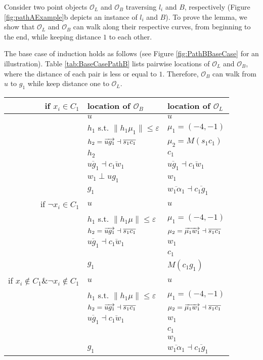 \documentclass[12pt]{dalthesis}
\def\favoritefont{\bfseries \sffamily}
\def\QED{\ensuremath{{\Box}}}
\def\markatright#1{\leavevmode\unskip\nobreak\quad\hspace*{\fill}{#1}}
\newenvironment{proof}
	{\begin{trivlist}\item[\hskip\labelsep{\favoritefont Proof:}]}
	{\markatright{\QED}\end{trivlist}}
\newcommand{\eps}{\varepsilon}
\newcommand{\CO}{{\mathscr O}}
\newcommand{\Seg}[1]{{\overline{#1}}}
\newcommand{\cfev}{{l}}
\begin{document}
\begin{proof}



Consider two point objects $\CO_L$ and $\CO_B$ 
traversing $\cfev_i$ and $B$, respectively (Figure \ref{fig:pathAExample}b depicts an instance of $\cfev_i$ and $B$).
To prove the lemma, we show that $\CO_L$ and $\CO_B$ can walk along
their respective curves, from beginning to
the end, while keeping distance $1$ to each other. 

The base case of induction holds as follows 
(see Figure \ref{fig:PathBBaseCase} for an illustration).
Table \ref{tab:BaseCasePathB} lists  pairwise locations of 
$\CO_L$ and $\CO_B$, where the distance of each pair is less or equal to $1$.
Therefore, $\CO_B$ can walk from $u$ to $g_1$ while
keep distance one to $\CO_L$.

\begin{table}[h]
\centering
\begin{tabular}{ r | l | l  }
if $x_i \in C_1$   & location of $\CO_B$ & location of $\CO_L$  
 \\
\hline
    
&  $u$ & $u$  \\
&  				 $h_1$ s.t.  $\| h_1\mu_1 \| \le \eps$ & $\mu_1 = (-4,-1)$\\

				&    $h_2 = \Dir{ug_1} \dashv	 \Seg{s_1c_1} $ & $\mu_2 = M(s_1c_1)$   \\
&  				 			      $h_2 $ & $c_1$  \\
&    $\Seg{ug_1} \dashv \Seg{c_1w_1}$ &  $\Seg{ug_1} \dashv \Seg{c_1w_1}$ \\
&  				 		     $w_1 \perp ug_1 $ &   $w_1$  \\
& $g_1 $  & $\Seg{w_1\alpha_1}	\dashv \Seg{c_1g_1}$	      \\

\hline
if $\neg x_i \in C_1$ 
&  $u$ & $u$  \\
&  				 $h_1$ s.t.  $\| h_1\mu \| \le \eps$ & $\mu_1 = (-4,-1)$\\
& $h_2 = \Dir{ug_1} \dashv	 \Seg{s_1c_1} $ &  $\mu_2 = \Dir{\mu_1w_1} \dashv	 \Seg{s_1c_1} $\\
& $\Seg{ug_1} \dashv \Seg{c_1w_1}$ & $w_1$ \\
&  &  $c_1$\\
& $g_1$ &  $M(c_1g_1)$\\

\hline
if $x_i \notin C_{1} \& \neg x_i \notin C_{1}$ & $u$ & $u$  \\
&  				 $h_1$ s.t.  $\| h_1\mu \| \le \eps$ & $\mu_1 = (-4,-1)$\\
& $h_2 = \Dir{ug_1} \dashv	 \Seg{s_1c_1} $ &  $\mu_2 = \Dir{\mu_1w_1} \dashv	 \Seg{s_1c_1} $\\
& $\Seg{ug_1} \dashv \Seg{c_1w_1}$ & $w_1$ \\
&  &  $c_1$\\
&  &  $w_1$\\
& $g_1 $  & $\Seg{w_1\alpha_1}	\dashv \Seg{c_1g_1}$	      \\


\end{tabular}
\end{table}
\end{proof}
\end{document}
